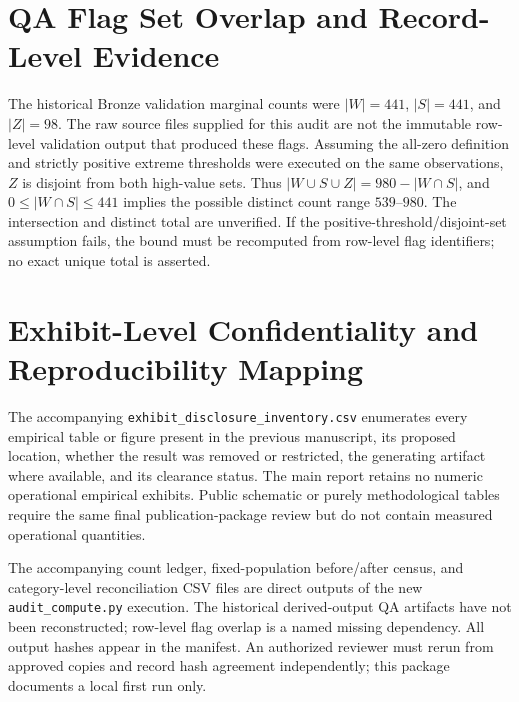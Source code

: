 \documentclass[11pt]{article}
\begin{document}
\section{QA Flag Set Overlap and Record-Level Evidence}
The historical Bronze validation marginal counts were $|W|=441$, $|S|=441$, and $|Z|=98$. The raw source files supplied for this audit are not the immutable row-level validation output that produced these flags. Assuming the all-zero definition and strictly positive extreme thresholds were executed on the same observations, $Z$ is disjoint from both high-value sets. Thus $|W\cup S\cup Z|=980-|W\cap S|$, and $0\le|W\cap S|\le441$ implies the possible distinct count range $539\text{--}980$. The intersection and distinct total are unverified. If the positive-threshold/disjoint-set assumption fails, the bound must be recomputed from row-level flag identifiers; no exact unique total is asserted.

\section{Exhibit-Level Confidentiality and Reproducibility Mapping}
The accompanying \texttt{exhibit\_disclosure\_inventory.csv} enumerates every empirical table or figure present in the previous manuscript, its proposed location, whether the result was removed or restricted, the generating artifact where available, and its clearance status. The main report retains no numeric operational empirical exhibits. Public schematic or purely methodological tables require the same final publication-package review but do not contain measured operational quantities.

The accompanying count ledger, fixed-population before/after census, and category-level reconciliation CSV files are direct outputs of the new \texttt{audit\_compute.py} execution. The historical derived-output QA artifacts have not been reconstructed; row-level flag overlap is a named missing dependency. All output hashes appear in the manifest. An authorized reviewer must rerun from approved copies and record hash agreement independently; this package documents a local first run only.
\end{document}
